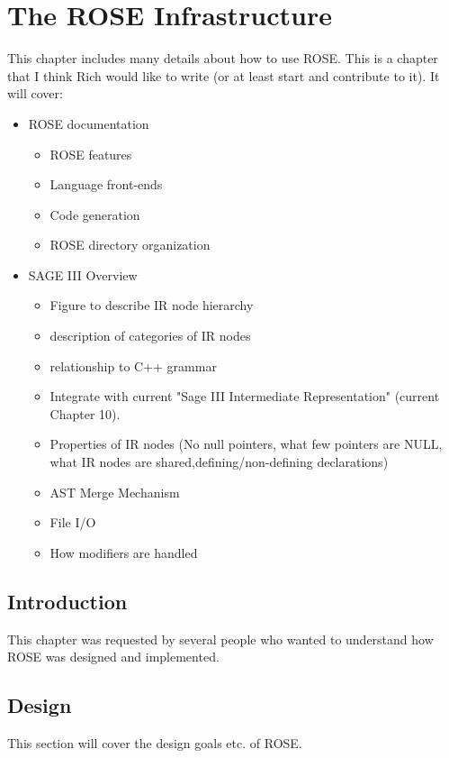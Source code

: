 \chapter{The ROSE Infrastructure}

\label{overviewOfRose:overviewOfRose}


This chapter includes many details about how to
use ROSE. This is a chapter that I think Rich would like to write
(or at least start and contribute to it).  It will cover:
\begin{itemize}
   \item ROSE documentation
   \begin{itemize}
      \item ROSE features
      \item Language front-ends
      \item Code generation
      \item ROSE directory organization
   \end{itemize}
   \item SAGE III Overview
   \begin{itemize}
      \item Figure to describe IR node hierarchy
      \item description of categories of IR nodes
      \item relationship to C++ grammar
      \item Integrate with current "Sage III Intermediate Representation" (current Chapter 10).
      \item Properties of IR nodes (No null pointers, what few pointers are NULL, what IR nodes are shared,defining/non-defining declarations)
      \item AST Merge Mechanism
      \item File I/O
      \item How modifiers are handled
   \end{itemize}
\end{itemize}


\section{Introduction}
     This chapter was requested by several people who wanted to understand 
how ROSE was designed and implemented.

\section{Design}
     This section will cover the design goals etc. of ROSE.
